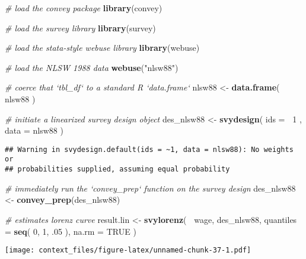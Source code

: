 \documentclass[]{book}
\newenvironment{Shaded}{\begin{snugshade}}{\end{snugshade}}
\newcommand{\CommentTok}[1]{\textcolor[rgb]{0.56,0.35,0.01}{\textit{#1}}}
\newcommand{\DataTypeTok}[1]{\textcolor[rgb]{0.13,0.29,0.53}{#1}}
\newcommand{\DecValTok}[1]{\textcolor[rgb]{0.00,0.00,0.81}{#1}}
\newcommand{\FloatTok}[1]{\textcolor[rgb]{0.00,0.00,0.81}{#1}}
\newcommand{\KeywordTok}[1]{\textcolor[rgb]{0.13,0.29,0.53}{\textbf{#1}}}
\newcommand{\NormalTok}[1]{#1}
\newcommand{\OperatorTok}[1]{\textcolor[rgb]{0.81,0.36,0.00}{\textbf{#1}}}
\newcommand{\OtherTok}[1]{\textcolor[rgb]{0.56,0.35,0.01}{#1}}
\newcommand{\StringTok}[1]{\textcolor[rgb]{0.31,0.60,0.02}{#1}}
\begin{document}
\begin{Shaded}
\begin{Highlighting}[]
\CommentTok{# load the convey package}
\KeywordTok{library}\NormalTok{(convey)}

\CommentTok{# load the survey library}
\KeywordTok{library}\NormalTok{(survey)}

\CommentTok{# load the stata-style webuse library}
\KeywordTok{library}\NormalTok{(webuse)}

\CommentTok{# load the NLSW 1988 data}
\KeywordTok{webuse}\NormalTok{(}\StringTok{"nlsw88"}\NormalTok{)}

\CommentTok{# coerce that `tbl_df` to a standard R `data.frame`}
\NormalTok{nlsw88 <-}\StringTok{ }\KeywordTok{data.frame}\NormalTok{( nlsw88 )}

\CommentTok{# initiate a linearized survey design object}
\NormalTok{des_nlsw88 <-}\StringTok{ }\KeywordTok{svydesign}\NormalTok{( }\DataTypeTok{ids =} \OperatorTok{~}\DecValTok{1}\NormalTok{ , }\DataTypeTok{data =}\NormalTok{ nlsw88 )}
\end{Highlighting}
\end{Shaded}

\begin{verbatim}
## Warning in svydesign.default(ids = ~1, data = nlsw88): No weights or
## probabilities supplied, assuming equal probability
\end{verbatim}

\begin{Shaded}
\begin{Highlighting}[]
\CommentTok{# immediately run the `convey_prep` function on the survey design}
\NormalTok{des_nlsw88 <-}\StringTok{ }\KeywordTok{convey_prep}\NormalTok{(des_nlsw88)}

\CommentTok{# estimates lorenz curve}
\NormalTok{result.lin <-}\StringTok{ }\KeywordTok{svylorenz}\NormalTok{( }\OperatorTok{~}\NormalTok{wage, des_nlsw88, }\DataTypeTok{quantiles =} \KeywordTok{seq}\NormalTok{( }\DecValTok{0}\NormalTok{, }\DecValTok{1}\NormalTok{, }\FloatTok{.05}\NormalTok{ ), }\DataTypeTok{na.rm =} \OtherTok{TRUE}\NormalTok{ )}
\end{Highlighting}
\end{Shaded}

\texttt{[image: context\_files/figure-latex/unnamed-chunk-37-1.pdf]}
\end{document}
